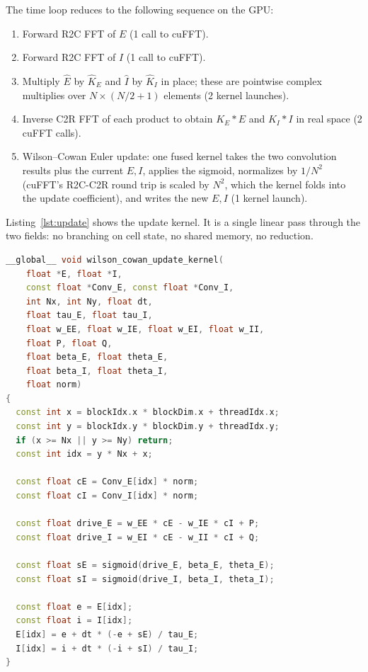 \documentclass[11pt]{article}
\begin{document}
The time loop reduces to the following sequence on the GPU:
\begin{enumerate}
  \item Forward R2C FFT of $E$ (1 call to cuFFT).
  \item Forward R2C FFT of $I$ (1 call to cuFFT).
  \item Multiply $\widehat{E}$ by $\widehat{K}_{E}$
    and $\widehat{I}$ by $\widehat{K}_{I}$ in place; these are pointwise
    complex multiplies over $N \times (N/2+1)$ elements (2 kernel
    launches).
  \item Inverse C2R FFT of each product to obtain
    $K_{E}\!*\!E$ and $K_{I}\!*\!I$ in real space (2 cuFFT calls).
  \item Wilson--Cowan Euler update: one fused kernel takes the two
    convolution results plus the current $E, I$, applies the sigmoid,
    normalizes by $1/N^{2}$ (cuFFT's R2C-C2R round trip is scaled by
    $N^{2}$, which the kernel folds into the update coefficient), and
    writes the new $E, I$ (1 kernel launch).
\end{enumerate}

Listing~\ref{lst:update} shows the update kernel. It is a single
linear pass through the two fields: no branching on cell state, no
shared memory, no reduction.

\begin{lstlisting}[language=C++,caption={Wilson--Cowan Euler update.
  Each thread handles one cell; the \texttt{norm} factor absorbs the
  $1/N^{2}$ from the unnormalized cuFFT inverse transform.},
  label={lst:update}]
__global__ void wilson_cowan_update_kernel(
    float *E, float *I,
    const float *Conv_E, const float *Conv_I,
    int Nx, int Ny, float dt,
    float tau_E, float tau_I,
    float w_EE, float w_IE, float w_EI, float w_II,
    float P, float Q,
    float beta_E, float theta_E,
    float beta_I, float theta_I,
    float norm)
{
  const int x = blockIdx.x * blockDim.x + threadIdx.x;
  const int y = blockIdx.y * blockDim.y + threadIdx.y;
  if (x >= Nx || y >= Ny) return;
  const int idx = y * Nx + x;

  const float cE = Conv_E[idx] * norm;
  const float cI = Conv_I[idx] * norm;

  const float drive_E = w_EE * cE - w_IE * cI + P;
  const float drive_I = w_EI * cE - w_II * cI + Q;

  const float sE = sigmoid(drive_E, beta_E, theta_E);
  const float sI = sigmoid(drive_I, beta_I, theta_I);

  const float e = E[idx];
  const float i = I[idx];
  E[idx] = e + dt * (-e + sE) / tau_E;
  I[idx] = i + dt * (-i + sI) / tau_I;
}
\end{lstlisting}
\end{document}
